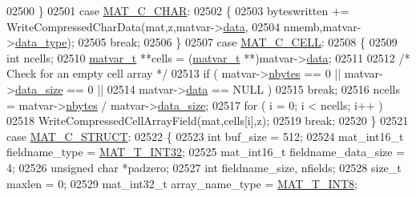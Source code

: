 \begin{DoxyCode}
{{{{{{{{{{{{{{{{02500         \}
02501         \textcolor{keywordflow}{case} \hyperlink{group___m_a_t_ggad4d60ae7b709fc81bfd744fb4c857c40aacdec5834df0861130b393697646119c}{MAT\_C\_CHAR}:
02502         \{
02503             byteswritten += WriteCompressedCharData(mat,z,matvar->\hyperlink{group___m_a_t_a5672978efa230bbdecdf38ede781f7fa}{data},
02504                 nmemb,matvar->\hyperlink{group___m_a_t_ab6aafe9bd77f0f077852593dec438144}{data\_type});
02505             \textcolor{keywordflow}{break};
02506         \}
02507         \textcolor{keywordflow}{case} \hyperlink{group___m_a_t_ggad4d60ae7b709fc81bfd744fb4c857c40a2f7abb47a1c51e248bd4e5e03cc81b08}{MAT\_C\_CELL}:
02508         \{
02509             \textcolor{keywordtype}{int}        ncells;
02510             \hyperlink{group___m_a_t_structmatvar__t}{matvar\_t} **cells = (\hyperlink{group___m_a_t_structmatvar__t}{matvar\_t} **)matvar->\hyperlink{group___m_a_t_a5672978efa230bbdecdf38ede781f7fa}{data};
02511 
02512             \textcolor{comment}{/* Check for an empty cell array */}
02513             if ( matvar->\hyperlink{group___m_a_t_abf1c844540503be2df9bb3db93cfe307}{nbytes} == 0 || matvar->\hyperlink{group___m_a_t_a9ad1c82e2b568da617e12dc73a26e1f9}{data\_size} == 0 ||
02514                  matvar->\hyperlink{group___m_a_t_a5672978efa230bbdecdf38ede781f7fa}{data}   == NULL )
02515                 \textcolor{keywordflow}{break};
02516             ncells  = matvar->\hyperlink{group___m_a_t_abf1c844540503be2df9bb3db93cfe307}{nbytes} / matvar->\hyperlink{group___m_a_t_a9ad1c82e2b568da617e12dc73a26e1f9}{data\_size};
02517             \textcolor{keywordflow}{for} ( i = 0; i < ncells; i++ )
02518                 WriteCompressedCellArrayField(mat,cells[i],z);
02519             \textcolor{keywordflow}{break};
02520         \}
02521         \textcolor{keywordflow}{case} \hyperlink{group___m_a_t_ggad4d60ae7b709fc81bfd744fb4c857c40acb467c7749c80902b798134c729bb521}{MAT\_C\_STRUCT}:
02522         \{
02523             \textcolor{keywordtype}{int} buf\_size = 512;
02524             mat\_int16\_t fieldname\_type = \hyperlink{group___m_a_t_ggacf7b3b879282b7ab3a51190e49bf3453a83e06a68320726c6572bfbb9f3addb1d}{MAT\_T\_INT32};
02525             mat\_int16\_t fieldname\_data\_size = 4;
02526             \textcolor{keywordtype}{unsigned} \textcolor{keywordtype}{char} *padzero;
02527             \textcolor{keywordtype}{int} fieldname\_size, nfields;
02528             \textcolor{keywordtype}{size\_t} maxlen = 0;
02529             mat\_int32\_t array\_name\_type = \hyperlink{group___m_a_t_ggacf7b3b879282b7ab3a51190e49bf3453a9807f5033ed4f9b548953742d9fd1658}{MAT\_T\_INT8};
}}}}}}}}}}}}}}}}
\end{DoxyCode}
